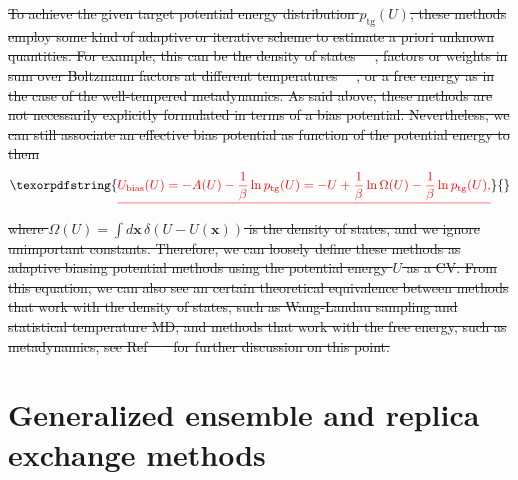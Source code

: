 \documentclass[9pt,review]{livecoms}
\newcommand{\vx}{\mathbf{x}}
\providecommand{\DIFdeltex}[1]{{\protect\color{red}\sout{#1}}}                      %
\providecommand{\DIFdelend}{} %
\providecommand{\DIFdel}[1]{\texorpdfstring{\DIFdeltex{#1}}{}} %
\DeclareRobustCommand{\DIFdelend}{\DIFOaddend \let\includegraphics\DIFOincludegraphics} %
\begin{document}
\DIFdel{To achieve the given target potential energy distribution $p_{\mathrm{tg}}(U)$, these methods employ some kind of adaptive or iterative scheme to estimate a priori unknown quantities. For example, this can be the density of states~\mbox{%
\cite{wang-landau:prl:2001:wang-landau,Kim2006_PRL_STMD,DePablo_DOS_2012}}\hspace{0pt}%
, factors or weights in sum over Boltzmann factors at different temperatures~\mbox{%
\cite{Gao_ITS_2008,invernizzi2020unified}}\hspace{0pt}%
, or a free energy as in the case of the well-tempered metadynamics. As said above, these methods are not necessarily explicitly formulated in terms of a bias potential. Nevertheless, we can still associate an effective bias potential as function of the potential energy to them
}\begin{displaymath}
\DIFdel{U_\mathrm{bias}(U) = - A(U) -\frac{1}{\beta} \ln p_{\mathrm{tg}}(U) = - U + \frac{1}{\beta} \ln \Omega(U) -\frac{1}{\beta} \ln p_{\mathrm{tg}}(U),
}\end{displaymath}%
\DIFdel{where $\Omega(U) = \int d\vx \, \delta(U-U(\vx))$ is the density of states, and we ignore unimportant constants. Therefore, we can loosely define these methods as adaptive biasing potential methods using the potential energy $U$ as a CV. From this equation, we can also see an certain theoretical equivalence between methods that work with the density of states, such as Wang-Landau sampling and statistical temperature MD, and methods that work with the free energy, such as metadynamics, see Ref~\mbox{%
\cite{Junghans2014wte-wl} }\hspace{0pt}%
for further discussion on this point.
}%

\DIFdelend \section{Generalized ensemble and replica exchange methods}
\label{sec:generalized-ensemble}
\end{document}
